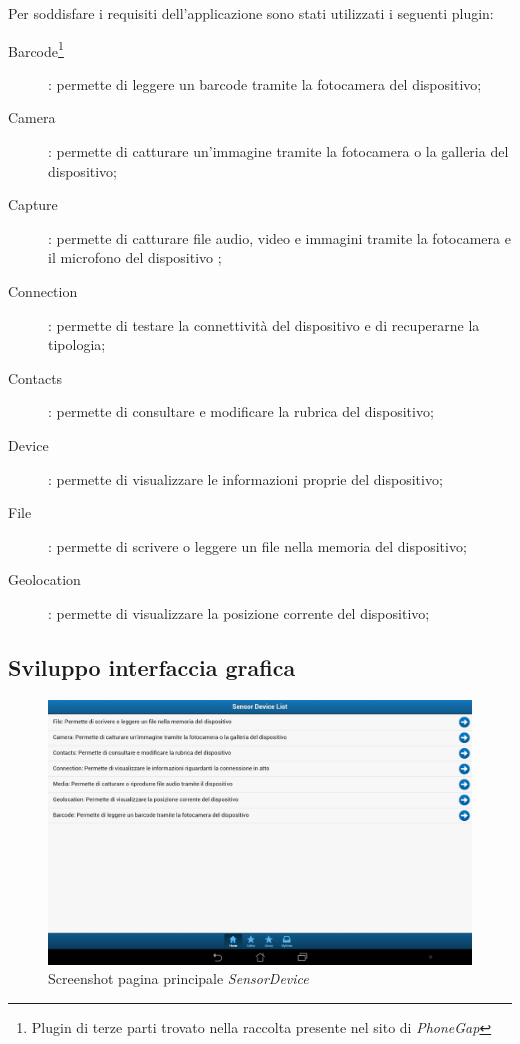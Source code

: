 Per soddisfare i requisiti dell'applicazione sono stati utilizzati i seguenti plugin:
\begin{description}
\item[Barcode\footnote{Plugin di terze parti \cite{wildabeast:barcodeScanner} trovato nella raccolta presente nel sito di \emph{PhoneGap}}]: permette di leggere un barcode tramite la fotocamera del dispositivo;
\item[Camera]: permette di catturare un'immagine tramite la fotocamera o la galleria del dispositivo;
\item[Capture]: permette di catturare file audio, video e immagini tramite la fotocamera e il microfono del dispositivo ;
\item[Connection]: permette di testare la connettività del dispositivo e di recuperarne la tipologia;
\item[Contacts]: permette di consultare e modificare la rubrica del dispositivo;
\item[Device]: permette di visualizzare le informazioni proprie del dispositivo;
\item[File]: permette di scrivere o leggere un file nella memoria del dispositivo;
\item [Geolocation]: permette di visualizzare la posizione corrente del dispositivo;
\end{description}

\subsection{Sviluppo interfaccia grafica}

\begin{figure}[htb]
\centering
\includegraphics[scale=0.25]{gfx/screenshot/screen_sensorDevice}
\caption{Screenshot pagina principale \emph{SensorDevice}}
\label{fig:screenshot sensordevice}
\end{figure}

